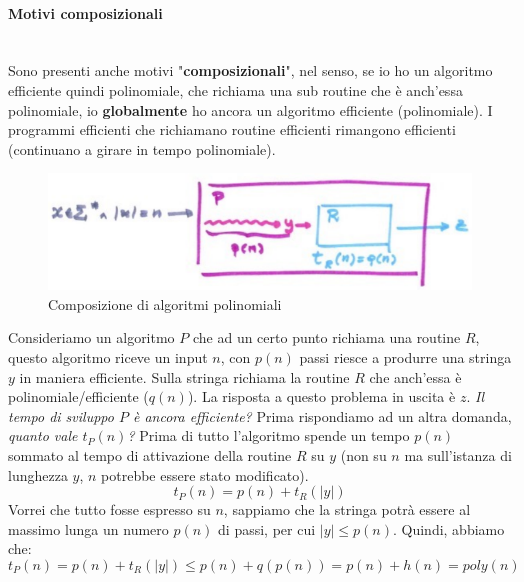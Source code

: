 \documentclass{article}
\begin{document}
\paragraph{Motivi composizionali}\mbox{}\\
Sono presenti anche motivi "\textbf{composizionali}", nel senso,
se io ho un algoritmo efficiente quindi polinomiale,
che richiama una sub routine che è anch'essa polinomiale, io
\textbf{globalmente} ho ancora un algoritmo efficiente (polinomiale).
\newline\newline
I programmi efficienti che richiamano routine efficienti rimangono efficienti (continuano
a girare in tempo polinomiale).
\begin{figure}[H]
    \centering
    \includegraphics[scale=0.6]{images/efficienti_esemp.png}
    \caption{Composizione di algoritmi polinomiali}
\end{figure}
Consideriamo un algoritmo $P$ che ad un certo punto richiama una routine $R$, questo algoritmo
riceve un input $n$, con $p(n)$ passi riesce a produrre una
stringa $y$ in maniera efficiente. Sulla stringa richiama la routine $R$ che anch'essa è polinomiale/efficiente ($q(n)$).
La risposta a questo problema in uscita è $z$.
\newline\newline
\textit{Il tempo di sviluppo $P$ è ancora efficiente?} Prima rispondiamo ad un altra domanda,
\textit{quanto vale $t_P(n)$?} Prima di tutto l'algoritmo spende un tempo $p(n)$ 
sommato al tempo di attivazione della routine $R$ su $y$
(non su $n$ ma sull'istanza di lunghezza $y$, $n$ potrebbe essere stato modificato).
$$t_P(n)=p(n)+t_R(|y|)$$
Vorrei che tutto fosse espresso su $n$, sappiamo che la stringa potrà essere al massimo lunga
un numero $p(n)$ di passi, per cui $|y|\leq p(n)$. Quindi, abbiamo che:
$$t_P(n)=p(n)+t_R(|y|)\leq p(n)+q(p(n))=p(n)+h(n)=poly(n)$$
\end{document}
